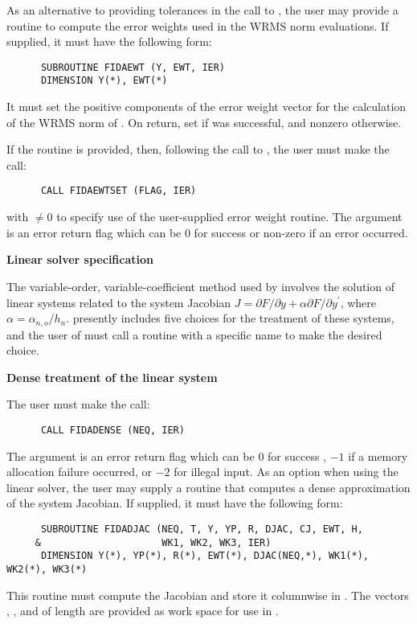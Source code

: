 \begin{Steps}
  As an alternative to providing tolerances in the call to , the
  user may provide a routine to compute the error weights used in the WRMS norm
  evaluations. If supplied, it must have the following form:
\begin{verbatim}
      SUBROUTINE FIDAEWT (Y, EWT, IER)
      DIMENSION Y(*), EWT(*)
\end{verbatim}
  It must set the positive components of the error weight vector  for
  the calculation of the WRMS norm of . On return, set
   if  was successful, and nonzero otherwise.

  If the  routine is provided, then, 
  following the call to , the user must make the call:
\begin{verbatim}
      CALL FIDAEWTSET (FLAG, IER)
\end{verbatim}
  with  $\neq 0$ to specify use of the user-supplied error weight routine.
  The argument  is an error return flag which can be $0$ 
  for success or non-zero if an error occurred.

\item\label{i:fida_lin_solv_spec} {\bf Linear solver specification} 
  
  The variable-order, variable-coefficient  method used by {\ida} involves
  the solution of linear systems related to the system Jacobian
  $J = \partial F / \partial y + \alpha \partial F / \partial y^\prime$,
  where $\alpha = \alpha_{n,o}/h_{n}$.  {\ida} presently includes five choices for
  the treatment of these systems, and the user of {\fida} must call a routine with
  a specific name to make the desired choice.

  {\s} {\bf Dense treatment of the linear system}
  
  The user must make the call:
\begin{verbatim}
      CALL FIDADENSE (NEQ, IER)
\end{verbatim}
  The argument  is an error return flag which can be $0$ 
  for success , $-1$ if a memory allocation failure occurred, or $-2$ for illegal
  input.  
  As an option when using the {\dense} linear solver, the user may supply a
  routine that computes a dense approximation of the system Jacobian. If supplied,
  it must have the following form:
\begin{verbatim}
      SUBROUTINE FIDADJAC (NEQ, T, Y, YP, R, DJAC, CJ, EWT, H,
     &                     WK1, WK2, WK3, IER)
      DIMENSION Y(*), YP(*), R(*), EWT(*), DJAC(NEQ,*), WK1(*), WK2(*), WK3(*)
\end{verbatim}
  This routine must compute the Jacobian and store it columnwise in .
  The vectors , , and  of length  are provided
  as work space for use in .
  

\end{Steps}
